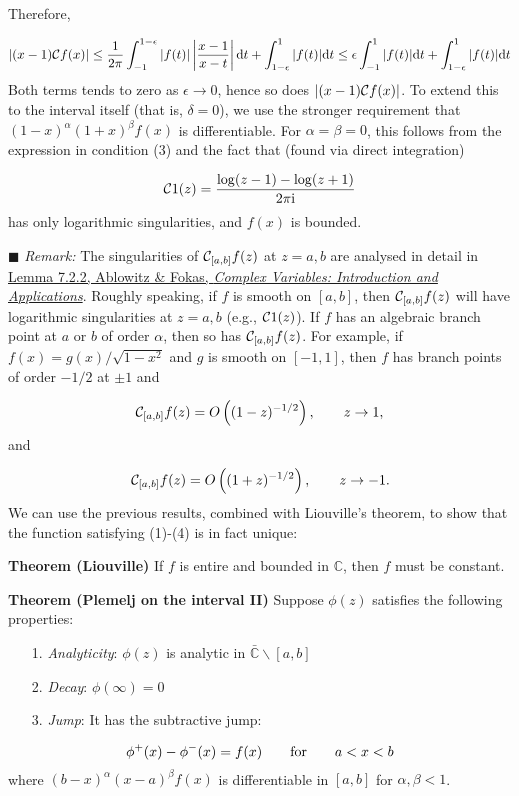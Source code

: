 \documentclass[12pt,a4paper]{article}
\def\qqfor{\qquad\hbox{for}\qquad}
\def\D{ {\rm d} }
\def\I{ {\rm i} }
\def\C{ {\mathbb C} }
\def\CC{ {\cal C} }
\def\dt{\D t}
\begin{document}
Therefore,

\[
| (x-1) {\cal C} f(x) | \leq {1 \over 2 \pi}\int_{-1}^{1-\epsilon} |f(t) | \left|{x -1 \over x-t }\right| \dt + \int_{1-\epsilon}^1 |f(t) | \dt \leq
\epsilon \int_{-1}^1 |f(t)| \dt + \int_{1-\epsilon}^1 |f(t) | \dt
\]
Both terms tends to zero as $\epsilon \rightarrow 0$, hence so does $| (x-1) {\cal C} f(x) |$.  To extend this to the interval itself (that is, $\delta = 0$), we  use the stronger requirement that $(1-x)^\alpha(1+x)^\beta f(x)$ is differentiable. For $\alpha = \beta = 0$, this follows from the expression in condition (3) and the fact that (found via direct integration)

\[
    \CC 1(z) =  {\log(z-1) - \log(z+1) \over 2 \pi \I}
\]
has only logarithmic singularities, and $f(x)$ is bounded.

\ensuremath{\blacksquare} \emph{Remark:} The singularities of  $\CC_{[a,b]} f(z)$ at $z = a, b$ are analysed in detail in \href{https://www.imperial.ac.uk/admin-services/library/}{Lemma 7.2.2, Ablowitz \& Fokas, \emph{Complex Variables: Introduction and Applications}}. Roughly speaking, if $f$ is smooth on $[a, b]$, then  $\CC_{[a,b]} f(z)$ will have logarithmic singularities at $z = a, b$ (e.g., $\CC 1(z)$). If $f$ has an algebraic branch point at $a$ or $b$ of order $\alpha$, then so has $\CC_{[a,b]} f(z)$. For example, if $f(x) = g(x)/\sqrt{1 -x^2}$ and $g$ is smooth on $[-1, 1]$, then $f$ has branch points of order $-1/2$ at $\pm 1$ and

\[
\CC_{[a,b]} f(z) = O\left( (1-z)^{-1/2}  \right),\qquad z \to 1,
\]
and

\[
\CC_{[a,b]} f(z) = O\left( (1+z)^{-1/2}  \right),\qquad z \to -1.
\]
We can use the previous results, combined with Liouville's theorem, to show that the function satisfying (1)-(4) is in fact unique:

\textbf{Theorem (Liouville)} If $f$ is entire and  bounded in ${\mathbb C}$, then $f$ must be constant.

\textbf{Theorem (Plemelj on the interval II)} Suppose $\phi(z)$ satisfies the following properties:

\begin{itemize}
\item[1. ] \emph{Analyticity}: $\phi(z)$ is analytic in $\bar \C \backslash [a,b]$


\item[2. ] \emph{Decay}: $\phi(\infty) = 0$


\item[3. ] \emph{Jump}: It has the subtractive jump:

\end{itemize}
\[
\phi^+(x) - \phi^-(x) = f(x) \qqfor a < x < b
\]
where $(b-x)^\alpha (x-a)^\beta f(x)$ is differentiable in $[a,b]$ for $\alpha,\beta < 1$.
\end{document}
